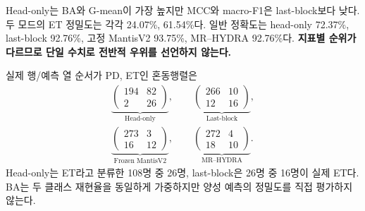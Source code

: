 \documentclass[11pt,a4paper]{article}
\begin{document}
Head-only는 BA와 G-mean이 가장 높지만 MCC와 macro-F1은 last-block보다 낮다.
두 모드의 ET 정밀도는 각각 24.07\%, 61.54\%다.
일반 정확도는 head-only 72.37\%, last-block 92.76\%,
고정 MantisV2 93.75\%, MR--HYDRA 92.76\%다.
\textbf{지표별 순위가 다르므로 단일 수치로 전반적 우위를 선언하지 않는다.}

실제 행/예측 열 순서가 PD, ET인 혼동행렬은
\begin{equation}
 \begin{gathered}
 \underbrace{\begin{pmatrix}194&82\\2&26\end{pmatrix}}_{\text{Head-only}},\qquad
 \underbrace{\begin{pmatrix}266&10\\12&16\end{pmatrix}}_{\text{Last-block}},\\[.8em]
 \underbrace{\begin{pmatrix}273&3\\16&12\end{pmatrix}}_{\text{Frozen MantisV2}},\qquad
 \underbrace{\begin{pmatrix}272&4\\18&10\end{pmatrix}}_{\text{MR--HYDRA}}.
 \end{gathered}
\end{equation}
Head-only는 ET라고 분류한 108명 중 26명, last-block은 26명 중 16명이 실제 ET다.
BA는 두 클래스 재현율을 동일하게 가중하지만 양성 예측의 정밀도를 직접 평가하지 않는다.
\clearpage
\end{document}
